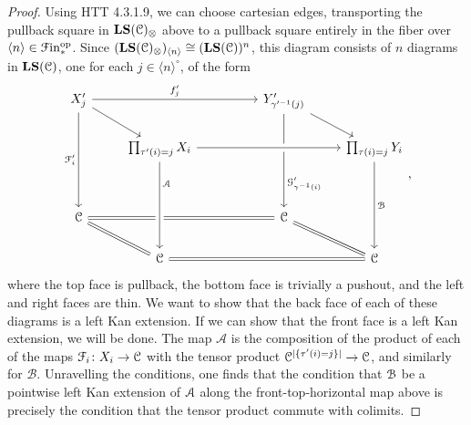 \documentclass[main.tex]{subfiles}
\begin{document}
\begin{proof}
  Using HTT 4.3.1.9, we can choose cartesian edges, transporting the pullback square in $\mathbf{LS}(\mathcal{C})_{\otimes}$ above to a pullback square entirely in the fiber over $\langle n \rangle \in \mathcal{F}\mathrm{in}_{*}^{\mathrm{op}}$. Since $(\mathbf{LS}(\mathcal{C})_{\otimes})_{\langle n \rangle} \cong (\mathbf{LS}(\mathcal{C}))^{n}$, this diagram consists of $n$ diagrams in $\mathbf{LS}(\mathcal{C})$, one for each $j \in \langle n \rangle^{\circ}$, of the form
  \begin{equation*}
    \begin{tikzcd}
      X'_{j}
      \arrow[rrr, "f'_{j}"]
      \arrow[dr]
      \arrow[ddd, swap, "\mathcal{F}_{i}'"]
      &&& Y'_{\gamma'^{-1}(j)}
      \arrow[ddd, near end, "\mathcal{G}_{\gamma^{-1}(i)}'"]
      \arrow[dr]
      \\
      & \prod_{\tau'(i) = j} X_{i}
      \arrow[rrr, crossing over]
      &&& \prod_{\tau(i) = j} Y_{i}
      \arrow[ddd, "\mathcal{B}"]
      \\
      \\
      \category{C}
      &&& \category{C}
      \arrow[lll, equals]
      \\
      & \category{C}
      \arrow[ul, equals]
      \arrow[from=uuu, crossing over, near start, "\mathcal{A}"]
      &&& \category{C}
      \arrow[lll, equals]
      \arrow[ul, equals]
    \end{tikzcd},
  \end{equation*}
  where the top face is pullback, the bottom face is trivially a pushout, and the left and right faces are thin. We want to show that the back face of each of these diagrams is a left Kan extension. If we can show that the front face is a left Kan extension, we will be done. The map $\mathcal{A}$ is the composition of the product of each of the maps $\mathcal{F}_{i}\colon X_{i} \to \mathcal{C}$ with the tensor product $\mathcal{C}^{{| \{\tau'(i) = j\} |}} \to \mathcal{C}$, and similarly for $\mathcal{B}$. Unravelling the conditions, one finds that the condition that $\mathcal{B}$ be a pointwise left Kan extension of $\mathcal{A}$ along the front-top-horizontal map above is precisely the condition that the tensor product commute with colimits.




\end{proof}
\end{document}
